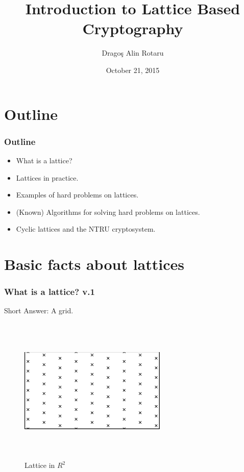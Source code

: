 \documentclass{beamer}
\title[Bitdefender, University of Bucharest]{Introduction to Lattice Based Cryptography}
\author[D.A.Rotaru]{Drago\c{s} Alin Rotaru} %
\institute[Bitdefender, Unibuc] %
{
Bitdefender Romania,
University of Bucharest\\ %
}
\date{October 21, 2015} %
\begin{document}
\begin{frame}
\titlepage %
\end{frame}



\section{Outline} %

\begin{frame}
    \frametitle{Outline} %
    \begin{itemize}
        \item What is a lattice?
        \item Lattices in practice.
        \item Examples of hard problems on lattices.
        \item (Known) Algorithms for solving hard problems on lattices.
        \item Cyclic lattices and the NTRU cryptosystem.
    \end{itemize}
\end{frame}


\section{Basic facts about lattices}
\begin{frame}
    \frametitle{What is a lattice? v.1}
     {
        Short Answer: A grid.
        \begin{figure}
            \includegraphics[width=7cm,height=7cm,keepaspectratio]{img/latticer2.png}
            \caption{Lattice in $R^2$}
        \end{figure}
    }
\end{frame}
\end{document}

